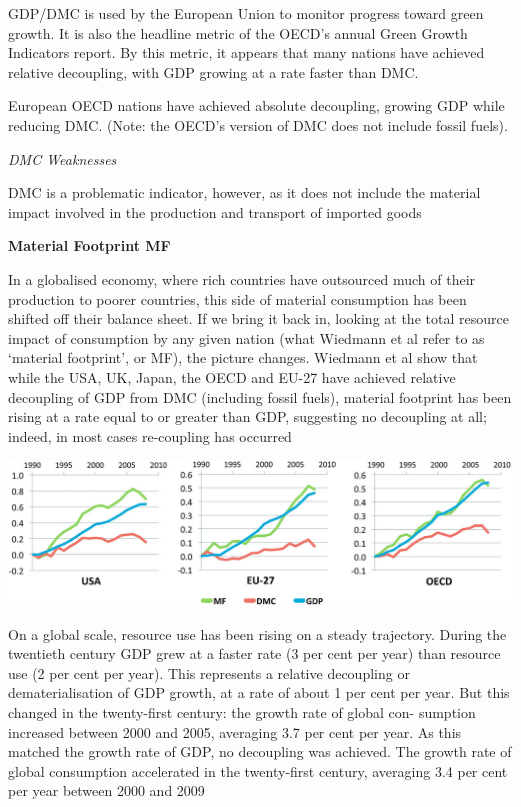\documentclass[
]{book}
\begin{document}
GDP/DMC is used by the European Union to monitor progress toward green growth. It is also the
headline metric of the OECD's annual Green Growth Indicators report.
By this metric, it appears that many nations have achieved relative decoupling, with GDP growing
at a rate faster than DMC.

European OECD nations have achieved absolute decoupling, growing GDP while reducing
DMC. (Note: the OECD's version of DMC does not include fossil fuels).

\emph{DMC Weaknesses}

DMC is a problematic indicator, however, as it does not include the material impact involved in the
production and transport of imported goods

\textbf{Material Footprint MF}

In a globalised economy, where rich countries have outsourced much of their production to poorer
countries, this side of material consumption has been shifted off their balance sheet. If we bring it
back in, looking at the total resource impact of consumption by any given nation (what Wiedmann
et al refer to as `material footprint', or MF), the picture changes. Wiedmann et al show that while the
USA, UK, Japan, the OECD and EU-27 have achieved relative decoupling of GDP from DMC (including
fossil fuels), material footprint has been rising at a rate equal to or greater than GDP, suggesting no
decoupling at all; indeed, in most cases re-coupling has occurred

\includegraphics{fig/material_use.png}

On a global scale, resource use has been rising on a steady trajectory.
During the twentieth century GDP grew at a faster rate (3 per cent per year) than resource use (2 per
cent per year).
This represents a relative decoupling or dematerialisation of GDP growth, at a rate of
about 1 per cent per year. But this changed in the twenty-first century: the growth rate of global con-
sumption increased between 2000 and 2005, averaging 3.7 per cent per year. As this matched the
growth rate of GDP, no decoupling was achieved.
The growth
rate of global consumption accelerated in the twenty-first century, averaging 3.4 per cent per year
between 2000 and 2009
\end{document}
